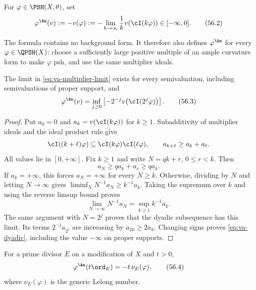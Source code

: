 \begin{definition}
\label{def:va-psh-analytification}
For $\varphi\in\PSH(X,\theta)$, set
\[
 \varphi^{\An}(v)
 :=-v(\varphi)
 :=-\lim_{k\to\infty}\frac1k
          v\!\left(\cI(k\varphi)\right)
 \in[-\infty,0].
\tag{56.2}\label{eq:va-multiplier-limit}
\]
\end{definition}

The formula contains no background form. It therefore also defines
$\varphi^{\An}$ for every $\varphi\in\QPSH(X)$: choose a sufficiently
large positive multiple of an ample curvature form to make $\varphi$
psh, and use the same multiplier ideals.


\begin{proposition}\label{prop:va-fekete}
The limit in \eqref{eq:va-multiplier-limit} exists for every semivaluation,
including semivaluations of proper support, and
\[
 \varphi^{\An}(v)
   =\inf_{j\geq0}
      \left[-2^{-j}v\!\left(\cI(2^j\varphi)\right)\right].
\tag{56.3}\label{eq:va-dyadic}
\]
\end{proposition}

\begin{proof}
Put $a_0=0$ and $a_k=v(\cI(k\varphi))$ for $k\geq1$.
Subadditivity of multiplier ideals and the ideal product rule give
\[
 \cI((k+\ell)\varphi)\subseteq\cI(k\varphi)\cI(\ell\varphi),
 \qquad a_{k+\ell}\geq a_k+a_\ell.
\]
All values lie in $[0,+\infty]$. Fix $k\geq1$ and write
$N=qk+r$, $0\leq r<k$. Then
\[
                  a_N\geq qa_k+a_r\geq qa_k.
\]
If $a_k=+\infty$, this forces $a_N=+\infty$ for every $N\geq k$.
Otherwise, dividing by $N$ and letting $N\to\infty$ gives
$\liminf_N N^{-1}a_N\geq k^{-1}a_k$. Taking the supremum over $k$
and using the reverse limsup bound proves
\[
           \lim_{N\to\infty}N^{-1}a_N
           =\sup_{k\geq1}k^{-1}a_k.
\]
The same argument with $N=2^j$ proves that the dyadic subsequence
has this limit. Its terms $2^{-j}a_{2^j}$ are increasing by
$a_{2k}\geq2a_k$. Changing signs proves \eqref{eq:va-dyadic},
including the value $-\infty$ on proper supports.
\end{proof}

\begin{proposition}\label{prop:va-divisorial-formula}
For a prime divisor $E$ on a modification of $X$ and $t>0$,
\[
             \varphi^{\An}(t\ord_E)=-t\,\nu_E(\varphi),
\tag{56.4}\label{eq:va-divisorial}
\]
where $\nu_E(\varphi)$ is the generic Lelong number.
\end{proposition}

